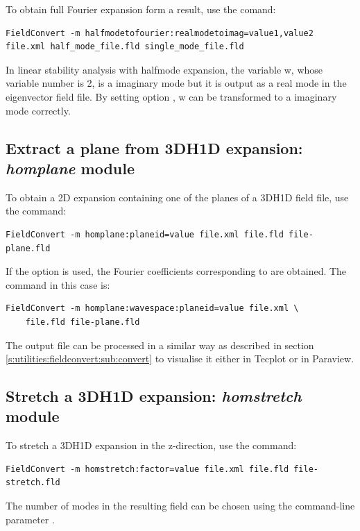 To obtain full Fourier expansion form a  result, use the comand:
\begin{lstlisting}[style=BashInputStyle]
  FieldConvert -m halfmodetofourier:realmodetoimag=value1,value2 file.xml half_mode_file.fld single_mode_file.fld
\end{lstlisting}

In linear stability analysis with halfmode expansion, the variable w, whose variable number is 2, is a imaginary mode but it is output as a real mode in the eigenvector field file. By setting option , w can be transformed to a imaginary mode correctly.

\subsection{Extract a plane from 3DH1D expansion: \textit{homplane} module}

To obtain a 2D expansion containing one of the planes of a
3DH1D field file, use the command:
\begin{lstlisting}[style=BashInputStyle]
FieldConvert -m homplane:planeid=value file.xml file.fld file-plane.fld
\end{lstlisting}

If the option  is used, the Fourier coefficients
corresponding to  are obtained. The command in this case is:
\begin{lstlisting}[style=BashInputStyle]
FieldConvert -m homplane:wavespace:planeid=value file.xml \
    file.fld file-plane.fld
\end{lstlisting}

The output file  can be processed in a similar
way as described in section \ref{s:utilities:fieldconvert:sub:convert}
to visualise it either in Tecplot or in Paraview.

\subsection{Stretch a 3DH1D expansion: \textit{homstretch} module}

To stretch a 3DH1D expansion in the z-direction, use the command:
\begin{lstlisting}[style=BashInputStyle]
FieldConvert -m homstretch:factor=value file.xml file.fld file-stretch.fld
\end{lstlisting}
The number of modes in the resulting field can be chosen using the command-line
parameter \inltt{-{}-output-points-hom-z}.


